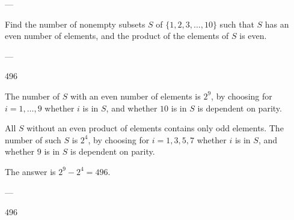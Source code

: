 
---

Find the number of nonempty subsets $S$ of $\{1,2,3,\ldots,10\}$ such that $S$ has an even number of elements, and the product of the elements of $S$ is even. 

---

\begin{answer}
    496
\end{answer}
The number of $S$ with an even number of elements is $2^9$, by choosing for $i=1,\ldots,9$ whether $i$ is in $S$, and whether $10$ is in $S$ is dependent on parity.

All $S$ without an even product of elements contains only odd elements. The number of such $S$ is $2^4$, by choosing for $i=1,3,5,7$ whether $i$ is in $S$, and whether $9$ is in $S$ is dependent on parity.

The answer is $2^9-2^4=496$.

---

496
